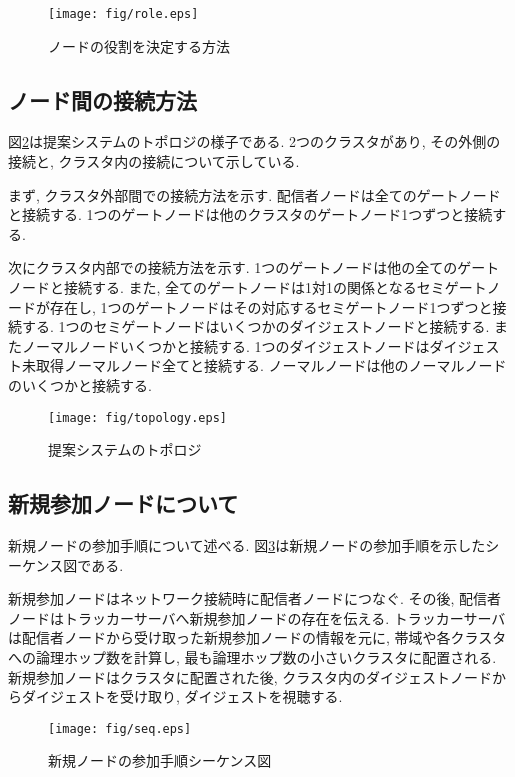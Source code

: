 \begin{figure}[h]
  \centering
  \texttt{[image: fig/role.eps]}
  \caption{ノードの役割を決定する方法}
  \label{fig:role}
\end{figure}

\newpage

\subsection{ノード間の接続方法}
図\ref{fig:topology}は提案システムのトポロジの様子である. 2つのクラスタがあり, その外側の接続と, クラスタ内の接続について示している.

まず, クラスタ外部間での接続方法を示す. 配信者ノードは全てのゲートノードと接続する. 1つのゲートノードは他のクラスタのゲートノード1つずつと接続する.

次にクラスタ内部での接続方法を示す. 1つのゲートノードは他の全てのゲートノードと接続する. また, 全てのゲートノードは1対1の関係となるセミゲートノードが存在し, 1つのゲートノードはその対応するセミゲートノード1つずつと接続する. 1つのセミゲートノードはいくつかのダイジェストノードと接続する. またノーマルノードいくつかと接続する. 1つのダイジェストノードはダイジェスト未取得ノーマルノード全てと接続する. ノーマルノードは他のノーマルノードのいくつかと接続する.

\begin{figure}[h]
  \centering
  \texttt{[image: fig/topology.eps]}
  \caption{提案システムのトポロジ}
  \label{fig:topology}
\end{figure}

\newpage

\subsection{新規参加ノードについて}
新規ノードの参加手順について述べる. 図\ref{fig:seq}は新規ノードの参加手順を示したシーケンス図である.

新規参加ノードはネットワーク接続時に配信者ノードにつなぐ. その後, 配信者ノードはトラッカーサーバへ新規参加ノードの存在を伝える. トラッカーサーバは配信者ノードから受け取った新規参加ノードの情報を元に, 帯域や各クラスタへの論理ホップ数を計算し, 最も論理ホップ数の小さいクラスタに配置される. 新規参加ノードはクラスタに配置された後, クラスタ内のダイジェストノードからダイジェストを受け取り, ダイジェストを視聴する.

\begin{figure}[h]
  \centering
  \texttt{[image: fig/seq.eps]}
  \caption{新規ノードの参加手順シーケンス図}
  \label{fig:seq}
\end{figure}

